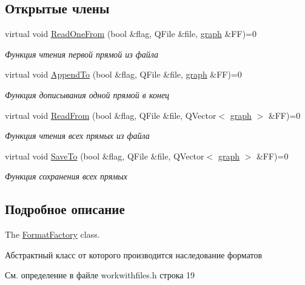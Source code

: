 \subsection*{Открытые члены}
\begin{DoxyCompactItemize}
\item 
virtual void \hyperlink{class_format_factory_a0002fa7430aefd926ac94c38155b146e}{Read\+One\+From} (bool \&flag, Q\+File \&file, \hyperlink{classgraph}{graph} \&FF)=0
\begin{DoxyCompactList}\small\item\em Функция чтения первой прямой из файла \end{DoxyCompactList}\item 
virtual void \hyperlink{class_format_factory_ae29ad79ca214f944962094487e668c8c}{Append\+To} (bool \&flag, Q\+File \&file, \hyperlink{classgraph}{graph} \&FF)=0
\begin{DoxyCompactList}\small\item\em Функция дописывания одной прямой в конец \end{DoxyCompactList}\item 
virtual void \hyperlink{class_format_factory_ad3136c43b27e86cf755106381081e67c}{Read\+From} (bool \&flag, Q\+File \&file, Q\+Vector$<$ \hyperlink{classgraph}{graph} $>$ \&FF)=0
\begin{DoxyCompactList}\small\item\em Функция чтения всех прямых из файла \end{DoxyCompactList}\item 
virtual void \hyperlink{class_format_factory_ac787363aa133a274ae674526dcc2b301}{Save\+To} (bool \&flag, Q\+File \&file, Q\+Vector$<$ \hyperlink{classgraph}{graph} $>$ \&FF)=0
\begin{DoxyCompactList}\small\item\em Функция сохранения всех прямых \end{DoxyCompactList}\end{DoxyCompactItemize}


\subsection{Подробное описание}
The \hyperlink{class_format_factory}{Format\+Factory} class. 

Абстрактный класс от которого производится наследование форматов 

См. определение в файле workwithfiles.\+h строка 19



